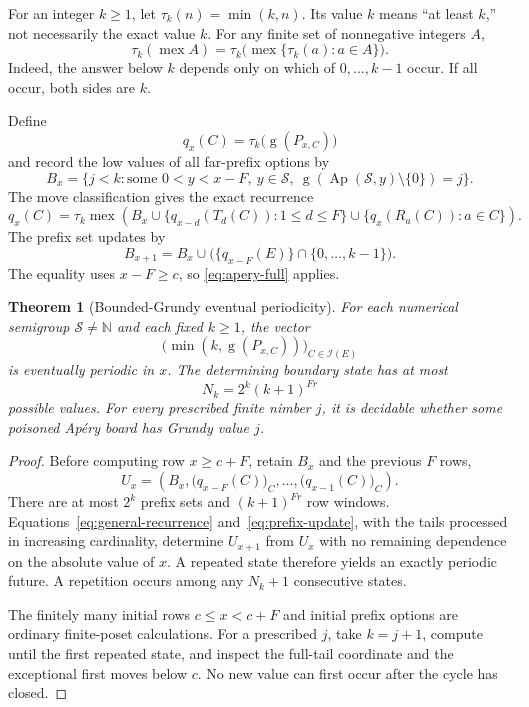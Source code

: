 \documentclass[11pt,letterpaper]{article}
\numberwithin{equation}{section}
\newtheorem{theorem}{Theorem}[section]
\theoremstyle{definition}
\newcommand{\N}{\mathbb N}
\newcommand{\Sg}{\mathcal S}
\newcommand{\Gr}{\operatorname{g}}
\newcommand{\Ap}{\operatorname{Ap}}
\newcommand{\mex}{\operatorname{mex}}
\begin{document}
For an integer $k\geq1$, let $\tau_k(n)=\min(k,n)$. Its value $k$ means
``at least $k$,'' not necessarily the exact value $k$. For any finite set
of nonnegative integers $A$,
\begin{equation}\label{eq:truncated-mex}
 \tau_k(\mex A)=\tau_k\bigl(\mex\{\tau_k(a):a\in A\}\bigr).
\end{equation}
Indeed, the answer below $k$ depends only on which of
$0,\ldots,k-1$ occur. If all occur, both sides are $k$.

Define
\[
 q_x(C)=\tau_k\bigl(\Gr(P_{x,C})\bigr)
\]
and record the low values of all far-prefix options by
\[
 B_x=\{j<k:\text{some }0<y<x-F,\ y\in\Sg,
    \ \Gr(\Ap(\Sg,y)\setminus\{0\})=j\}.
\]
The move classification gives the exact recurrence
\begin{equation}\label{eq:general-recurrence}
 q_x(C)=\tau_k\mex\left(
 B_x\cup\{q_{x-d}(T_d(C)):1\leq d\leq F\}
       \cup\{q_x(R_a(C)):a\in C\}\right).
\end{equation}
The prefix set updates by
\begin{equation}\label{eq:prefix-update}
 B_{x+1}=B_x\cup\bigl(\{q_{x-F}(E)\}\cap\{0,\ldots,k-1\}\bigr).
\end{equation}
The equality uses $x-F\geq c$, so \cref{eq:apery-full} applies.

\begin{theorem}[Bounded-Grundy eventual periodicity]\label{thm:periodicity}
For each numerical semigroup $\Sg\neq\N$ and each fixed $k\geq1$, the
vector
\[
 \bigl(\min(k,\Gr(P_{x,C}))\bigr)_{C\in\mathcal I(E)}
\]
is eventually periodic in $x$. The determining boundary state has at most
\begin{equation}\label{eq:state-bound}
 N_k=2^k(k+1)^{Fr}
\end{equation}
possible values. For every prescribed finite nimber $j$, it is decidable
whether some poisoned Ap\'ery board has Grundy value $j$.
\end{theorem}

\begin{proof}
Before computing row $x\geq c+F$, retain $B_x$ and the previous $F$ rows,
\[
 U_x=\left(B_x,\bigl(q_{x-F}(C)\bigr)_C,\ldots,
                    \bigl(q_{x-1}(C)\bigr)_C\right).
\]
There are at most $2^k$ prefix sets and $(k+1)^{Fr}$ row windows.
Equations~\eqref{eq:general-recurrence} and~\eqref{eq:prefix-update}, with the tails
processed in increasing cardinality, determine $U_{x+1}$ from $U_x$ with
no remaining dependence on the absolute value of $x$. A repeated state
therefore yields an exactly periodic future. A repetition occurs among any
$N_k+1$ consecutive states.

The finitely many initial rows $c\leq x<c+F$ and initial prefix options
are ordinary finite-poset calculations. For a prescribed $j$, take
$k=j+1$, compute until the first repeated state, and inspect the full-tail
coordinate and the exceptional first moves below $c$. No new value can
first occur after the cycle has closed.
\end{proof}
\end{document}
